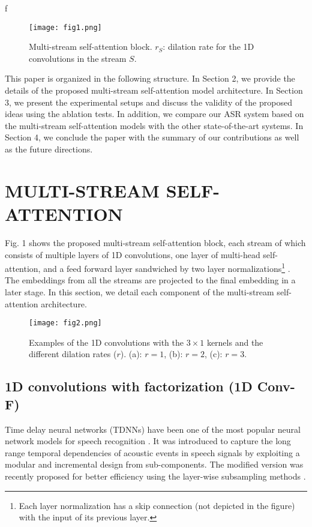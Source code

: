 f\documentclass{article}
\begin{document}
\begin{figure}[t]
  \centering
  \centerline{\texttt{[image: fig1.png]}}
  \caption{Multi-stream self-attention block. $r_{S}$: dilation rate for the 1D convolutions in the stream $S$.}
\end{figure}

This paper is organized in the following structure. In Section 2, we provide the details of the proposed multi-stream self-attention model architecture. In Section 3, we present the experimental setups and discuss the validity of the proposed ideas using the ablation tests. In addition, we compare our ASR system based on the multi-stream self-attention models with the other state-of-the-art systems. In Section 4, we conclude the paper with the summary of our contributions as well as the future directions.

\section{MULTI-STREAM SELF-ATTENTION}
\label{sec:format}

Fig. 1 shows the proposed multi-stream self-attention block, each stream of which consists of multiple layers of 1D convolutions, one layer of multi-head self-attention, and a feed forward layer sandwiched by two layer normalizations\footnote{Each layer normalization has a skip connection (not depicted in the figure) with the input of its previous layer.} \cite{ln}. The embeddings from all the streams are projected to the final embedding in a later stage. In this section, we detail each component of the multi-stream self-attention architecture. 

\begin{figure}[t]
  \centering
  \centerline{\texttt{[image: fig2.png]}}
  \caption{Examples of the 1D convolutions with the $3 \times 1$ kernels and the different dilation rates ($r$). (a): $r = 1$, (b): $r = 2$, (c): $r = 3$.}
\end{figure}

\subsection{1D convolutions with factorization (1D Conv-F)}
Time delay neural networks (TDNNs) have been one of the most popular neural network models for speech recognition \cite{tdnn,tdnn15povey}. It was introduced to capture the long range temporal dependencies of acoustic events in speech signals \cite{tdnn} by exploiting a modular and incremental design from sub-components. The modified version was recently proposed for better efficiency using the layer-wise subsampling methods \cite{tdnn15povey}. 
\end{document}
